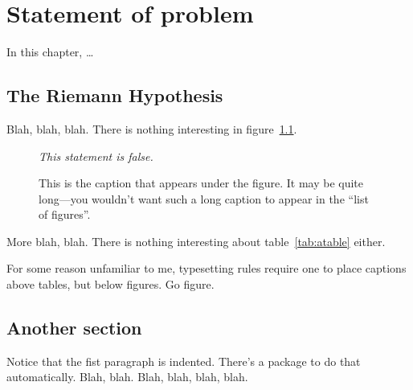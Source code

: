 \chapter{Statement of problem\label{chap:one}}

In this chapter, \ldots

\section{The Riemann Hypothesis\label{sec:hypothesis}}

Blah, blah, blah. There is nothing interesting in
figure~\ref{fig:afigure}.
\begin{figure}[htb]
  \begin{center}
    \emph{This statement is false.}
  \end{center}%
\caption[This alternate caption appears in the list of figures.]{This is the
caption that appears under the figure. It may be quite long---you wouldn't want
such a long caption to appear in the ``list of figures''.}
\label{fig:afigure}
\end{figure}

More blah, blah. There is nothing interesting about
table~\ref{tab:atable} either.
\begin{table}[htb]
\caption[Strange rules.]{For some reason unfamiliar to me,
typesetting rules require one to place captions above tables,
but below figures. Go figure.}\label{tab:atable}
  \begin{center}
  \end{center}
\end{table}

\section{Another section\label{sec:two}}

Notice that the fist paragraph is indented. There's a package
to do that automatically. Blah, blah. Blah, blah, blah, blah.

